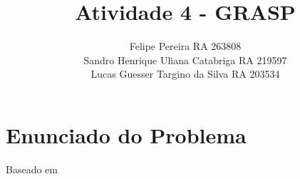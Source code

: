 \documentclass{article}
\title{Atividade 4 - GRASP}
\author{
    Felipe Pereira RA 263808 \\
    Sandro Henrique Uliana Catabriga RA 219597 \\
    Lucas Guesser Targino da Silva RA 203534
}
\begin{document}
\maketitle

\section{Enunciado do Problema}

Baseado em \cite{bib:grasp}



\end{document}
